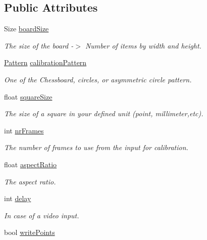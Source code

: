 \subsection*{Public Attributes}
\begin{DoxyCompactItemize}
\item 
Size \mbox{\hyperlink{class_settings_a5030a7164df923bb3b86dd7a0fc9af30}{board\+Size}}
\begin{DoxyCompactList}\small\item\em The size of the board -\/$>$ Number of items by width and height. \end{DoxyCompactList}\item 
\mbox{\hyperlink{class_settings_a0e7117abd9427a6f8bc1d1d8d456b5c8}{Pattern}} \mbox{\hyperlink{class_settings_a94551b7ffe8ac60311b035b2905e9498}{calibration\+Pattern}}
\begin{DoxyCompactList}\small\item\em One of the Chessboard, circles, or asymmetric circle pattern. \end{DoxyCompactList}\item 
float \mbox{\hyperlink{class_settings_a6c94708776ad1ce258fc44f2101f5941}{square\+Size}}
\begin{DoxyCompactList}\small\item\em The size of a square in your defined unit (point, millimeter,etc). \end{DoxyCompactList}\item 
int \mbox{\hyperlink{class_settings_a7e6654cd0e51791ed687eaa85f8fc143}{nr\+Frames}}
\begin{DoxyCompactList}\small\item\em The number of frames to use from the input for calibration. \end{DoxyCompactList}\item 
float \mbox{\hyperlink{class_settings_af55c910308a0d773055d0b19261bb3b8}{aspect\+Ratio}}
\begin{DoxyCompactList}\small\item\em The aspect ratio. \end{DoxyCompactList}\item 
int \mbox{\hyperlink{class_settings_a5fe947366441009187d633f9e4663256}{delay}}
\begin{DoxyCompactList}\small\item\em In case of a video input. \end{DoxyCompactList}\item 
bool \mbox{\hyperlink{class_settings_a53ac449815682c6bfae7e50944ba0565}{write\+Points}}

\end{DoxyCompactItemize}
